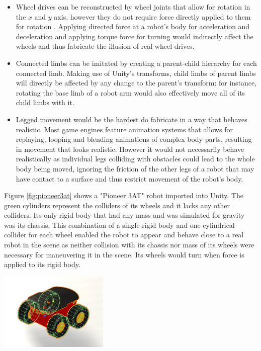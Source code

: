 \begin{itemize}
    \item Wheel drives can be reconstructed by wheel joints that allow for rotation in the $x$ and $y$ axis, however they do not require force directly applied to them for rotation . Applying directed force at a robot's body for acceleration and deceleration and applying torque force for turning would indirectly affect the wheels and thus fabricate the illusion of real wheel drives. 
    \item Connected limbs can be imitated by creating a parent-child hierarchy for each connected limb. Making use of Unity's transforms, child limbs of parent limbs will directly be affected by any change to the parent's transform: for instance, rotating the base limb of a robot arm would also effectively move all of its child limbs with it.
    \item Legged movement would be the hardest do fabricate in a way that behaves realistic. Most game engines feature animation systems that allows for replaying, looping and blending animations of complex body parts, resulting in movement that looks realistic. However it would not necessarily behave realistically as individual legs colliding with obstacles could lead to the whole body being moved, ignoring the friction of the other legs of a robot that may have contact to a surface and thus restrict movement of the robot's body.
\end{itemize}

Figure \ref{fig:pioneer3at} shows a "Pioneer 3AT" robot imported into Unity. The green cylinders represent the colliders of its wheels and it lacks any other colliders. Its only rigid body that had any mass and was simulated for gravity was its chassis. This combination of a single rigid body and one cylindrical collider for each wheel enabled the robot to appear and behave close to a real robot in the scene as neither collision with its chassis nor mass of its wheels were necessary for maneuvering it in the scene. Its wheels would turn when force is applied to its rigid body.

\begin{center}
    \includegraphics[width=0.39\textwidth]{tex/img/ch05/Pioneer3AT.png}
    \label{fig:pioneer3at}
\end{center}

